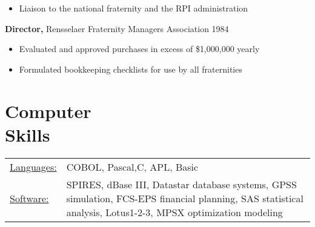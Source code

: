 \documentclass[margin]{res}
\begin{document}
\begin{resume}
\begin{itemize}
                 \item Liaison to the national fraternity and the RPI 
                 administration 
		 \end{itemize}

                  {\bf  Director,}  Rensselaer Fraternity Managers 
              Association     \hfill                                 1984 
                 \begin{itemize} \itemsep -2pt

               \item    Evaluated and approved purchases in excess of 
                 {\$}1,000,000 yearly 
                 
               \item  Formulated bookkeeping checklists for use by all 
                 fraternities 
		 \end{itemize}



\section{Computer \\ Skills}
   \begin{tabular}{l p{3in}}
    \underline{Languages:} & COBOL, Pascal,C, APL, Basic \\

     \underline{Software:} &  SPIRES, dBase III, Datastar database 
                        systems, GPSS simulation, FCS-EPS financial 
                        planning, SAS statistical analysis, 
                        Lotus1-2-3, MPSX optimization modeling 
 \end{tabular}

\end{resume} 
\end{document}
